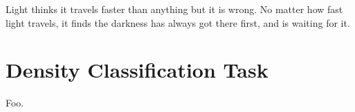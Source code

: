 
\begin{savequote}[99mm]
Light thinks it travels faster than anything but it is wrong. No matter how fast light travels, it finds the darkness has always got there first, and is waiting for it.
\end{savequote}

\chapter{Density Classification Task}
\label{chap:dct}

Foo.